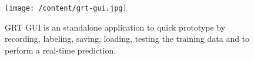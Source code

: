 \begin{figure}
	\centering 
	\texttt{[image: /content/grt-gui.jpg]} \caption{GRT GUI is an standalone application to quick prototype by recording, labeling, saving, loading, testing the training data and to perform a real-time prediction. \cite{16}} \label{fg:grt:gui} 
\end{figure}
